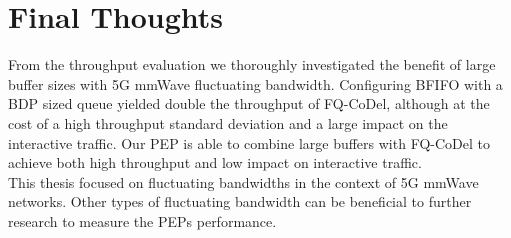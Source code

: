 \documentclass[a4paper,english, 11pt]{report}
\begin{document}
\section{Final Thoughts}
From the throughput evaluation we thoroughly investigated the benefit of large buffer sizes with 5G mmWave fluctuating bandwidth. Configuring BFIFO with a BDP sized queue yielded double the throughput of FQ-CoDel, although at the cost of a high throughput standard deviation and a large impact on the interactive traffic. Our PEP is able to combine large buffers with FQ-CoDel to achieve both high throughput and low impact on interactive traffic.\\

This thesis focused on fluctuating bandwidths in the context of 5G mmWave networks. Other types of fluctuating bandwidth can be beneficial to further research to measure the PEPs performance.

{}

\end{document}
